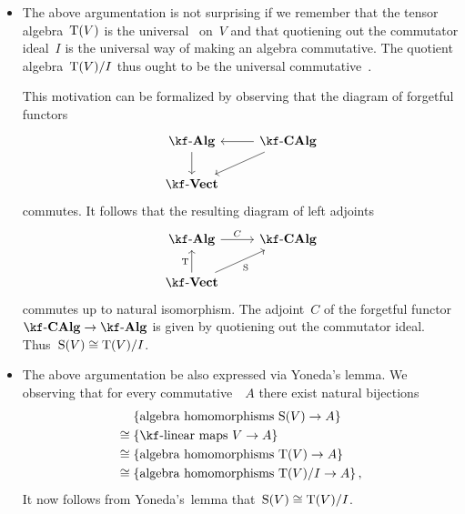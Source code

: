 \begin{recall}
\begin{description}
\begin{itemize}
        \item
          The above argumentation is not surprising if we remember that the tensor algebra~$\operatorname{T}(V)$ is the universal~{\algebra{$\kf$}} on~$V$ and that quotiening out the commutator ideal~$I$ is the universal way of making an algebra commutative.
          The quotient algebra~$\operatorname{T}(V)/I$ thus ought to be the universal commutative~{\algebra{$\kf$}}.
          
          This motivation can be formalized by observing that the diagram of forgetful functors
          \[
            \begin{tikzcd}
              \cAlg{\kf}
              \arrow{d}
              &
              \cCAlg{\kf}
              \arrow{l}
              \arrow{dl}
              \\
              \cVect{\kf}
              &
              {}
            \end{tikzcd}
          \]
          commutes.
          It follows that the resulting diagram of left adjoints
          \[
            \begin{tikzcd}
              \cAlg{\kf}
              \arrow{r}[above]{C}
              &
              \cCAlg{\kf}
              \\
              \cVect{\kf}
              \arrow{u}[left]{\Tensor}
              \arrow{ur}[below right]{\Symm}
              &
              {}
            \end{tikzcd}
          \]
          commutes up to natural isomorphism.
          The adjoint~$C$ of the forgetful functor~$\cCAlg{\kf} \to \cAlg{\kf}$ is given by quotiening out the commutator ideal.
          Thus~$\operatorname{S}(V) \cong \operatorname{T}(V)/I$.
        \item
          The above argumentation be also expressed via Yoneda’s lemma.
          We observing that for every commutative~{\algebra{$\kf$}}~$A$ there exist natural bijections
          \begin{align*}
            {}&
            \{ \textstyle\text{algebra homomorphisms~$\Symm(V) \to A$} \}
            \\
            \cong{}&
            \{ \textstyle\text{{\linear{$\kf$}} maps~$V \to A$} \}
            \\
            \cong{}&
            \{ \textstyle\text{algebra homomorphisms~$\Tensor(V) \to A$} \}
            \\
            \cong{}&
            \{ \textstyle\text{algebra homomorphisms~$\Tensor(V)/I \to A$} \} \,,
          \end{align*}
          It now follows from Yoneda’s~lemma that~$\operatorname{S}(V) \cong \operatorname{T}(V)/I$.
      \end{itemize}
  \end{description}
\end{recall}


